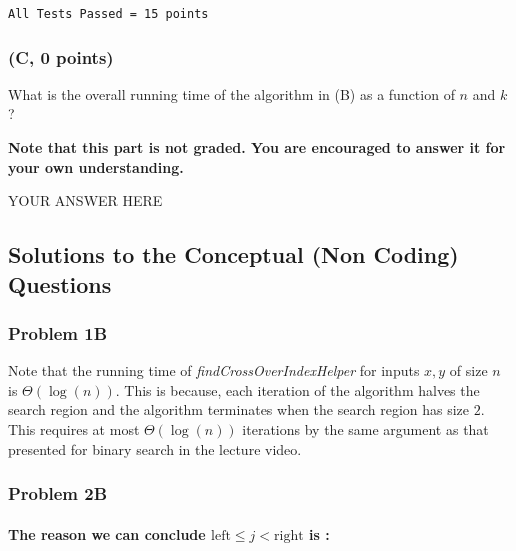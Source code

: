 \documentclass[
]{article}
\begin{document}
\begin{verbatim}
All Tests Passed = 15 points
\end{verbatim}

\hypertarget{c-0-points}{%
\subsubsection{(C, 0 points)}\label{c-0-points}}

What is the overall running time of the algorithm in (B) as a function
of \(n\) and \(k\)?

\textbf{Note that this part is not graded. You are encouraged to answer
it for your own understanding.}

YOUR ANSWER HERE

\hypertarget{solutions-to-the-conceptual-non-coding-questions}{%
\subsection{Solutions to the Conceptual (Non Coding)
Questions}\label{solutions-to-the-conceptual-non-coding-questions}}

\hypertarget{problem-1b}{%
\subsubsection{Problem 1B}\label{problem-1b}}

Note that the running time of \emph{findCrossOverIndexHelper} for inputs
\(x,y\) of size \(n\) is \(\Theta(\log(n))\). This is because, each
iteration of the algorithm halves the search region and the algorithm
terminates when the search region has size \(2\). This requires at most
\(\Theta(\log(n))\) iterations by the same argument as that presented
for binary search in the lecture video.

\hypertarget{problem-2b}{%
\subsubsection{Problem 2B}\label{problem-2b}}

\hypertarget{the-reason-we-can-conclude-textleft-leq-j--textright-is-}{%
\paragraph{\texorpdfstring{The reason we can conclude
\(\text{left} \leq j < \text{right}\) is
:}{The reason we can conclude \textbackslash text\{left\} \textbackslash leq j \textless{} \textbackslash text\{right\} is :}}\label{the-reason-we-can-conclude-textleft-leq-j--textright-is-}}
\end{document}
